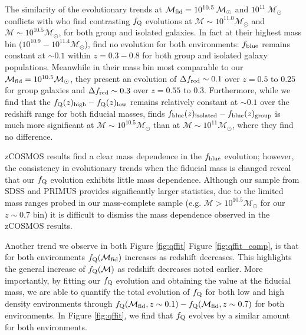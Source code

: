 \documentclass{emulateapj}
\begin{document}
The similarity of the evolutionary trends at $\mathcal{M}_{\rm{fid}} = 10^{10.5} \: \mathcal{M}_{\odot}$ and $10^{11} \: \mathcal{M}_{\odot}$ conflicts with \cite{Iovino:2010aa} who find contrasting $f_{\rm{Q}}$ evolutions at $\mathcal{M} \sim 10^{11.0} \mathcal{M}_{\odot}$ and $\mathcal{M} \sim 10^{10.5} \mathcal{M}_{\odot}$,  for both group and isolated galaxies. In fact at their highest mass bin ($10^{10.9} - 10^{11.4} \mathcal{M}_{\odot}$), \cite{Iovino:2010aa} find no evolution for both environments: $f_{\rm{blue}}$ remains constant at $\sim 0.1$ within $z = 0.3 - 0.8$ for both group and isolated galaxy populations. Meanwhile in their mass bin most comparable to our $\mathcal{M}_{\rm{fid}} = 10^{10.5} \mathcal{M}_{\odot}$, they present an evolution of $\Delta f_{\rm{red}} \sim 0.1$ over $z = 0.5$ to $0.25$ for group galaxies and $\Delta f_{\rm{red}} \sim 0.3$ over $z = 0.55$ to $0.3$. Furthermore, while we find that the $f_{\rm{Q}}(z)_{\rm{high}} - f_{\rm{Q}}(z)_{\rm{low}}$ remains relatively constant at $\sim 0.1$ over the redshift range for both fiducial masses, \cite{Iovino:2010aa} finds $f_{\rm{blue}}(z)_{ \rm{isolated}} - f_{\rm{blue}}(z)_{\rm{group}}$ is much more significant at $\mathcal{M} \sim 10^{10.5} \mathcal{M}_{\odot}$ than at $\mathcal{M} \sim 10^{11} \mathcal{M}_{\odot}$, where they find no difference. 

zCOSMOS results find a clear mass dependence in the $f_{\rm{blue}}$ evolution; however, the consistency in evolutionary trends when the fiducial mass is changed reveal that our $f_{\rm{Q}}$ evolution exhibits little mass dependence. Although our sample from SDSS and PRIMUS provides significantly larger statistics, due to the limited mass ranges probed in our mass-complete sample (e.g. $\mathcal{M} > 10^{10.5} \mathcal{M}_{\odot}$ for our $z \sim 0.7$ bin) it is difficult to dismiss the mass dependence observed in the zCOSMOS results.

Another trend we observe in both Figure \ref{fig:qffit} Figure \ref{fig:qffit_comp}, is that for both environments $f_{\rm{Q}}(\mathcal{M}_{\rm{fid}})$ increases as redshift decreases. This highlights the general increase of $f_{\rm{Q}}(\mathcal{M})$ as redshift decreases noted earlier. More importantly, by fitting our $f_{\rm{Q}}$ evolution and obtaining the value at the fiducial mass, we are able to quantify the total evolution of $f_{\rm{Q}}$ for both low and high density environments through $f_{\rm{Q}}(\mathcal{M}_{\rm{fid}}, z \sim 0.1) - f_{\rm{Q}}(\mathcal{M}_{\rm{fid}}, z \sim 0.7)$ for both environments. In Figure \ref{fig:qffit}, we find that $f_{\rm{Q}}$ evolves by a similar amount for both environments. 
\end{document}
